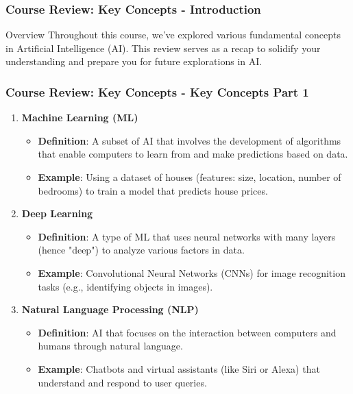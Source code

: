\documentclass[aspectratio=169]{beamer}
\begin{document}
\begin{frame}[fragile]
    \frametitle{Course Review: Key Concepts - Introduction}
    \begin{block}{Overview}
        Throughout this course, we've explored various fundamental concepts in Artificial Intelligence (AI).
        This review serves as a recap to solidify your understanding and prepare you for future explorations in AI.
    \end{block}
\end{frame}

\begin{frame}[fragile]
    \frametitle{Course Review: Key Concepts - Key Concepts Part 1}
    \begin{enumerate}
        \item \textbf{Machine Learning (ML)} 
            \begin{itemize}
                \item \textbf{Definition}: A subset of AI that involves the development of algorithms that enable computers to learn from and make predictions based on data.
                \item \textbf{Example}: Using a dataset of houses (features: size, location, number of bedrooms) to train a model that predicts house prices.
            \end{itemize}
        
        \item \textbf{Deep Learning}
            \begin{itemize}
                \item \textbf{Definition}: A type of ML that uses neural networks with many layers (hence "deep") to analyze various factors in data.
                \item \textbf{Example}: Convolutional Neural Networks (CNNs) for image recognition tasks (e.g., identifying objects in images).
            \end{itemize}
        
        \item \textbf{Natural Language Processing (NLP)} 
            \begin{itemize}
                \item \textbf{Definition}: AI that focuses on the interaction between computers and humans through natural language.
                \item \textbf{Example}: Chatbots and virtual assistants (like Siri or Alexa) that understand and respond to user queries.
            \end{itemize}
    \end{enumerate}
\end{frame}
\end{document}
